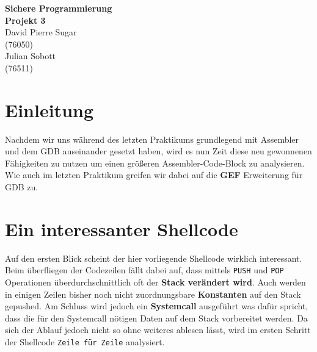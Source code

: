\documentclass[12pt]{article}
\begin{document}
\begin{center}
  \textbf{\LARGE Sichere Programmierung} \\[1ex]%
  \textbf{\Large Projekt 3}\\[2ex] %
  David Pierre Sugar\\ %
  (76050) \\ %
  Julian Sobott\\ %
  (76511) \\ %
  
\end{center}

\section{Einleitung}
Nachdem wir uns während des letzten Praktikums grundlegend mit Assembler und dem GDB auseinander gesetzt haben, wird es nun Zeit diese neu gewonnenen Fähigkeiten zu nutzen um einen größeren Assembler-Code-Block zu analysieren.
\newline
\newline
Wie auch im letzten Praktikum greifen wir dabei auf die \textbf{GEF} Erweiterung für GDB zu.

\section{Ein interessanter Shellcode}
Auf den ersten Blick scheint der hier vorliegende Shellcode wirklich interessant. Beim überfliegen der Codezeilen fällt dabei auf, dass mittels \texttt{PUSH} und \texttt{POP} Operationen überdurchschnittlich oft der \textbf{Stack verändert wird}. Auch werden in einigen Zeilen bisher noch nicht zuordnungsbare \textbf{Konstanten} auf den Stack gepushed. Am Schluss wird jedoch ein \textbf{Systemcall} ausgeführt was dafür spricht, dass die für den Systemcall nötigen Daten auf dem Stack vorbereitet werden.
\newline
\newline
Da sich der Ablauf jedoch nicht so ohne weiteres ablesen lässt, wird im ersten Schritt der Shellcode \texttt{Zeile für Zeile} analysiert.

\end{document}
